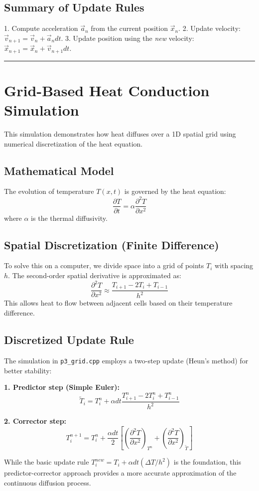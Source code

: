 \subsection*{Summary of Update Rules}
1. Compute acceleration $\vec{a}_n$ from the current position $\vec{x}_n$.
2. Update velocity: $\vec{v}_{n+1} = \vec{v}_n + \vec{a}_n dt$.
3. Update position using the \emph{new} velocity: $\vec{x}_{n+1} = \vec{x}_n + \vec{v}_{n+1} dt$.

\vspace{3em}
\hrule
\vspace{2em}

\section*{Grid-Based Heat Conduction Simulation}

This simulation demonstrates how heat diffuses over a 1D spatial grid using numerical discretization of the heat equation.

\subsection*{Mathematical Model}

The evolution of temperature $T(x, t)$ is governed by the heat equation:
\[
\frac{\partial T}{\partial t} = \alpha \frac{\partial^2 T}{\partial x^2}
\]
where $\alpha$ is the thermal diffusivity.

\subsection*{Spatial Discretization (Finite Difference)}

To solve this on a computer, we divide space into a grid of points $T_i$ with spacing $h$. The second-order spatial derivative is approximated as:
\[
\frac{\partial^2 T}{\partial x^2} \approx \frac{T_{i+1} - 2T_i + T_{i-1}}{h^2}
\]
This allows heat to flow between adjacent cells based on their temperature difference.

\subsection*{Discretized Update Rule}

The simulation in \texttt{p3\_grid.cpp} employs a two-step update (Heun's method) for better stability:

\textbf{1. Predictor step (Simple Euler):}
\[
\tilde{T}_i = T_i^n + \alpha dt \frac{T_{i+1}^n - 2T_i^n + T_{i-1}^n}{h^2}
\]

\textbf{2. Corrector step:}
\[
T_i^{n+1} = T_i^n + \frac{\alpha dt}{2} \left[ \left( \frac{\partial^2 T}{\partial x^2} \right)_{T^n} + \left( \frac{\partial^2 T}{\partial x^2} \right)_{\tilde{T}} \right]
\]

While the basic update rule $T_i^{new} = T_i + \alpha dt (\Delta T / h^2)$ is the foundation, this predictor-corrector approach provides a more accurate approximation of the continuous diffusion process.
